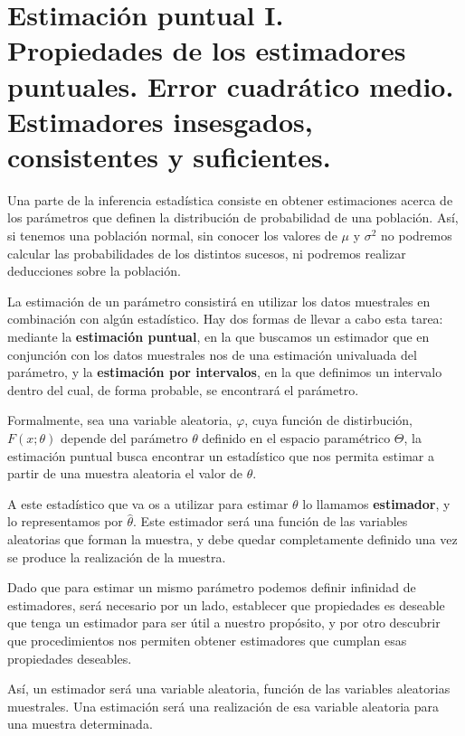 \chapter[Estimaci\'on puntual I.]{Estimaci\'on puntual I. \\
\normalsize Propiedades de los estimadores puntuales. Error cuadr\'atico medio. Estimadores insesgados, consistentes y suficientes.}


Una parte de la inferencia estad\'istica consiste en obtener estimaciones acerca de los par\'ametros que definen la distribuci\'on de probabilidad de una poblaci\'on. As\'i, si tenemos una poblaci\'on normal, sin conocer los valores de $\mu$ y $\sigma^2$ no podremos calcular las probabilidades de los distintos sucesos, ni podremos realizar deducciones sobre la poblaci\'on.

La estimaci\'on de un par\'ametro consistir\'a en utilizar los datos muestrales en combinaci\'on con alg\'un estad\'istico. Hay dos formas de llevar a cabo esta tarea: mediante la \textbf{estimaci\'on puntual}, en la que buscamos un estimador que en conjunci\'on con los datos muestrales nos de una estimaci\'on univaluada del par\'ametro, y la \textbf{estimaci\'on por intervalos}, en la que definimos un intervalo dentro del cual, de forma probable, se encontrar\'a el par\'ametro.

Formalmente, sea una variable aleatoria, $\varphi$, cuya funci\'on de distirbuci\'on, $F(x;\theta)$ depende del par\'ametro $\theta$ definido en el espacio param\'etrico $\Theta$, la estimaci\'on puntual busca encontrar un estad\'istico que nos permita estimar a partir de una muestra aleatoria el valor de $\theta$.

A este estad\'istico que va os a utilizar para estimar $\theta$ lo llamamos \textbf{estimador}, y lo representamos por $\hat{\theta}$. Este estimador ser\'a una funci\'on de las variables aleatorias que forman la muestra, y debe quedar completamente definido una vez se produce la realizaci\'on de la muestra.

Dado que para estimar un mismo par\'ametro podemos definir infinidad de estimadores, ser\'a necesario por un lado, establecer que propiedades es deseable que tenga un estimador para ser \'util a nuestro prop\'osito, y por otro descubrir que procedimientos nos permiten obtener estimadores que cumplan esas propiedades deseables.

As\'i, un estimador ser\'a una variable aleatoria, funci\'on de las variables aleatorias muestrales. Una estimaci\'on ser\'a una realizaci\'on de esa variable aleatoria para una muestra determinada.



